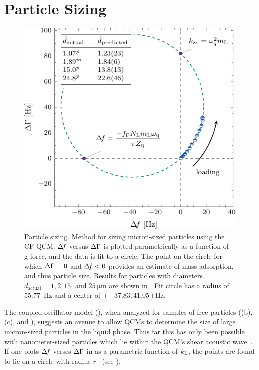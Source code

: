 \section{Particle Sizing}
\begin{figure}[ht]
\centering
\includegraphics{qcm/figures/circlefit.pdf}
\caption{ Particle sizing.  Method for sizing micron-sized particles using the CF-QCM. 
$\Delta\!f$ versus $\Delta\Gamma$ is plotted parametrically as a function of g-force, and
the data is fit to a circle.  The point on the circle for which $\Delta\Gamma=0$ and
$\Delta\!f<0$ provides an estimate of mass adsorption, and thus particle size.
Results for particles with diameters $\bar{d}_\mathrm{actual}=1, 2,
15,\,\mathrm{and}\;\SI{25}{\micro\meter}$ are shown in
.  Fit circle has a radius of \SI{55.77}{\hertz} and
a center of $(-37.83,41.05) \si{\hertz}$. }
\label{fig:circlefit}
\end{figure}

The coupled oscillator model (), when analyzed for
samples of free particles ((b),
(c), and ), suggests an avenue
to allow QCMs to determine the size of large micron-sized particles in the
liquid phase.  Thus far this has only been possible with nanometer-sized
particles which lie within the QCM's shear acoustic
wave~\cite{olsson2013using}.  If one plots $\Delta\!f$ verses $\Delta\Gamma$ in
 as a parametric function of $k_\mathrm{L}$, the points are
found to lie on a circle with radius $r_\mathrm{L}$ (see
).  

